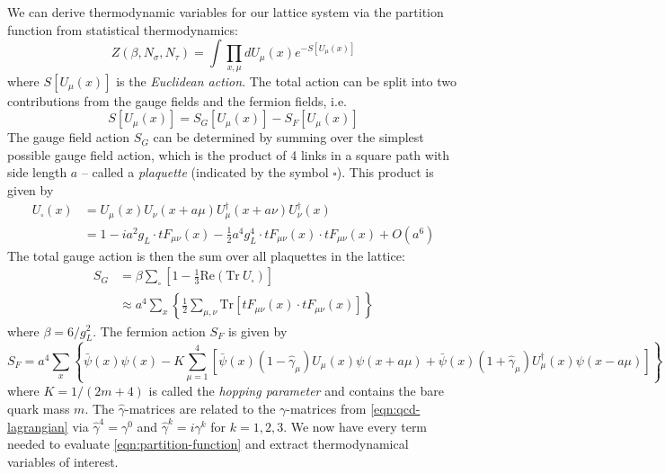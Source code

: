 We can derive thermodynamic variables for our lattice system via the partition function from statistical thermodynamics:
\begin{equation}
  \label{eqn:partition-function}
  Z(\beta,N_{\sigma},N_{\tau}) = \int \prod_{x,\mu} dU_{\mu}(x) e^{-S[U_{\mu}(x)]}
\end{equation}
where $S[U_{\mu}(x)]$ is the \textit{Euclidean action}.
The total action can be split into two contributions from the gauge fields and the fermion fields, i.e.
\begin{equation}
  \label{eqn:total-action}
  S[U_{\mu}(x)] = S_G[U_{\mu}(x)] - S_F[U_{\mu}(x)]
\end{equation}
The gauge field action $S_G$ can be determined by summing over the simplest possible gauge field action, which is the product of 4 links in a square path with side length $a$ -- called a \textit{plaquette} (indicated by the symbol $\square$).
This product is given by
\begin{align}
  \label{eqn:plaquette-transporter}
  U_{\square}(x) &= U_{\mu}(x) U_{\nu}(x+a\mu) U^{\dagger}_{\mu}(x+a\nu) U^{\dagger}_{\nu}(x) \\
  &= 1 - ia^2 g_L \cdot t F_{\mu \nu}(x) - \frac{1}{2} a^4 g_L^4 \cdot t F_{\mu \nu}(x) \cdot t F_{\mu \nu}(x) + O(a^6)
\end{align}
The total gauge action is then the sum over all plaquettes in the lattice:
\begin{align}
  \label{eqn:gauge-action}
  S_G &= \beta \sum_{\square} \left[  1 - \frac{1}{3} \text{Re}\left(\text{Tr}\ U_{\square}\right) \right] \\
  &\approx a^4 \sum_{x} \left\{ \frac{1}{2} \sum_{\mu,\nu} \text{Tr}\left[ t F_{\mu \nu}(x) \cdot t F_{\mu \nu}(x)  \right] \right\}
\end{align}
where $\beta = 6/g_L^2$.
The fermion action $S_F$ is given by
\begin{equation}
  \label{eqn:fermion-action}
  S_F = a^4 \sum_x \left\{ \bar{\psi}(x) \psi(x) - K \sum_{\mu = 1}^{4} \left[ \bar{\psi}(x)\left(1 - \hat{\gamma}_{\mu} \right) U_{\mu}(x) \psi(x+a\mu) + \bar{\psi}(x)\left(1 + \hat{\gamma}_{\mu} \right) U^{\dagger}_{\mu}(x) \psi(x-a\mu)  \right] \right\}
\end{equation}
where $K = 1/(2m + 4)$ is called the \textit{hopping parameter} and contains the bare quark mass $m$.
The $\hat{\gamma}$-matrices are related to the $\gamma$-matrices from \ref{eqn:qcd-lagrangian} via $\hat{\gamma}^4 = \gamma^0$ and $\hat{\gamma}^k = i\gamma^{k}$ for $k = 1,2,3$.
We now have every term needed to evaluate \ref{eqn:partition-function} and extract thermodynamical variables of interest.

